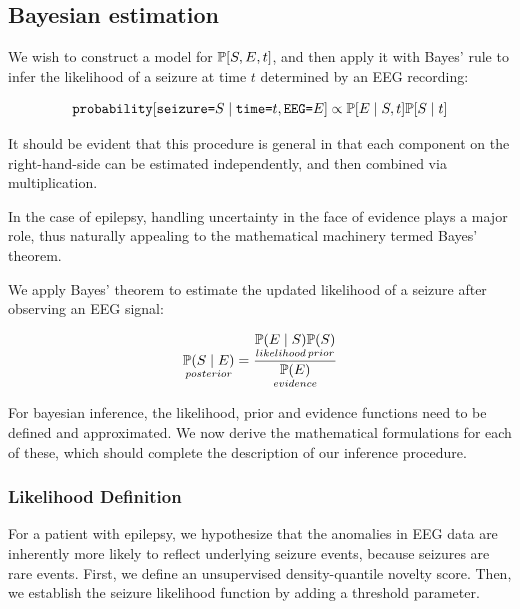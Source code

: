 \subsection{Bayesian estimation}
We wish to construct a model for $\mathbb{P}[S, E, t]$, and then apply it with Bayes' rule to infer the likelihood of a seizure at time $t$ determined by an EEG recording:

\begin{equation}
\texttt{probability}[\texttt{seizure=}S \mid \texttt{time=}t, \texttt{EEG=}E] \propto \mathbb{P}[E \mid S, t] \mathbb{P}[S \mid t]
\end{equation}

It should be evident that this procedure is general in that each component on the right-hand-side can be estimated independently, and then combined via multiplication.

In the case of epilepsy, handling uncertainty in the face of evidence plays a major role, thus naturally appealing to the mathematical machinery termed Bayes' theorem.

We apply Bayes' theorem to estimate the updated likelihood of a seizure after observing an EEG signal:



\begin{align}
    \underset{posterior}{\mathbb{P}(S \mid E)} = \frac{\underset{likelihood}{\mathbb{P}(E \mid S)} \underset{prior}{\mathbb{P}(S)}}{\underset{evidence}{\mathbb{P}(E)} } 
\end{align}


For bayesian inference, the likelihood, prior and evidence functions need to be defined and approximated. We now derive the mathematical formulations for each of these, which should complete the description of our inference procedure.


\subsubsection{Likelihood Definition}
For a patient with epilepsy, we hypothesize that the anomalies in EEG data are inherently more likely to reflect underlying seizure events, because seizures are rare events. First, we define an unsupervised density-quantile novelty score. Then, we establish the seizure likelihood function by adding a threshold parameter.


